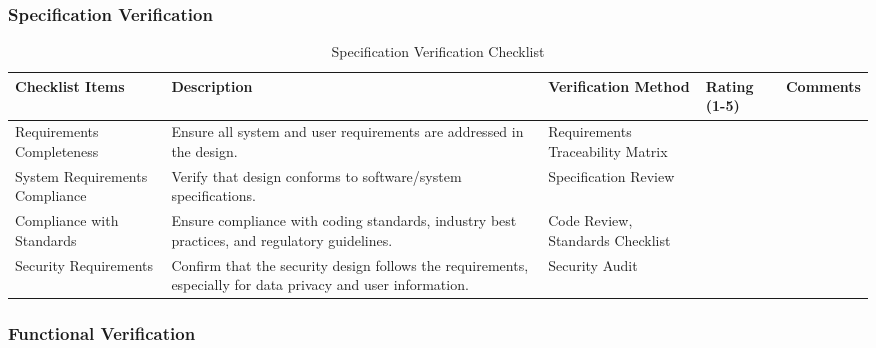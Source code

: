 \documentclass[12pt, titlepage]{article}
\begin{document}
\subsubsection{Specification Verification}

\begin{table}[h!]
\caption{Specification Verification Checklist}
\noindent \begin{tabular}{|>{\raggedright\arraybackslash}p{3cm}|>{\raggedright\arraybackslash}p{4cm}|>{\raggedright\arraybackslash}p{3cm}|p{1cm}|p{2.25cm}|}
	\hline
	\textbf{Checklist Items} & \textbf{Description} & \textbf{Verification Method} & \textbf{Rating (1-5)} & \textbf{Comments} \\ 
	\hline
	Requirements Completeness & Ensure all system and user requirements are addressed in the design. & Requirements Traceability Matrix & & \\
	\hline
	System Requirements Compliance & Verify that design conforms to software/system specifications. & Specification Review	& & \\
	\hline
	Compliance with Standards & Ensure compliance with coding standards, industry best practices, and regulatory guidelines. & Code Review, Standards Checklist	& & \\
	\hline
	Security Requirements & Confirm that the security design follows the requirements, especially for data privacy and user information. & Security Audit & & \\
	\hline
\end{tabular}
\end{table}

\newpage

\subsubsection{Functional Verification}
\end{document}
